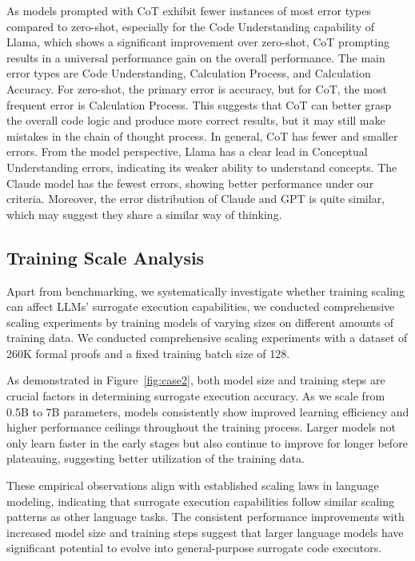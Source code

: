 As models prompted with CoT exhibit fewer instances of most error types compared to zero-shot, especially for the Code Understanding capability of Llama, which shows a significant improvement over zero-shot, CoT prompting results in a universal performance gain on the overall performance. The main error types are Code Understanding, Calculation Process, and Calculation Accuracy. For zero-shot, the primary error is accuracy, but for CoT, the most frequent error is Calculation Process. This suggests that CoT can better grasp the overall code logic and produce more correct results, but it may still make mistakes in the chain of thought process. In general, CoT has fewer and smaller errors. From the model perspective, Llama has a clear lead in Conceptual Understanding errors, indicating its weaker ability to understand concepts.
The Claude model has the fewest errors, showing better performance under our criteria. Moreover, the error distribution of Claude and GPT is quite similar, which may suggest they share a similar way of thinking.


\subsection{Training Scale Analysis}

Apart from benchmarking, we systematically investigate whether training scaling can affect LLMs' surrogate execution capabilities, we conducted comprehensive scaling experiments by training models of varying sizes on different amounts of training data. We conducted comprehensive scaling experiments with a dataset of 260K formal proofs
and a fixed training batch size of 128.

As demonstrated in Figure~\ref{fig:case2}, both model size and training steps are crucial factors in determining surrogate execution accuracy. As we scale from 0.5B to 7B parameters, models consistently show improved learning efficiency and higher performance ceilings throughout the training process. Larger models not only learn faster in the early stages but also continue to improve for longer before plateauing, suggesting better utilization of the training data.

These empirical observations align with established scaling laws in language modeling, indicating that surrogate execution capabilities follow similar scaling patterns as other language tasks. The consistent performance improvements with increased model size and training steps suggest that larger language models have significant potential to evolve into general-purpose surrogate code executors.